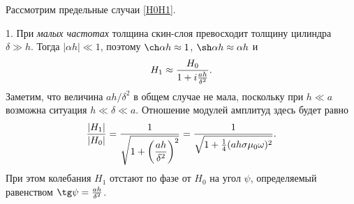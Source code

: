 %
%


Рассмотрим предельные случаи \eqref{H0H1}.

1. При \emph{малых частотах} толщина скин-слоя превосходит толщину цилиндра
$\delta \gg h$. Тогда $|\alpha h| \ll 1$,
поэтому $\ch \alpha h \approx 1$, $\sh \alpha h\approx \alpha h$ и
\begin{equation}\eqmark{H1}
H_1 \approx \frac{H_0}{1 + i \frac{a h}{\delta ^2}}.
\end{equation}
Заметим, что величина $ah/\delta^2$ в общем случае не мала, поскольку
при $h\ll a$ возможна ситуация $h\ll \delta \ll a$.
Отношение модулей амплитуд здесь будет равно
\begin{equation} \eqmark{27}
\frac{|H_1|}{|H_0|} = \frac{1}{\sqrt{1+\left(\dfrac{ah}{\delta^2}\right)^2}} =
\frac{1}{\sqrt{1+\frac14 (ah \sigma \mu_0 \omega)^2}}.
\end{equation}
При этом колебания $H_1$ отстают по фазе от $H_0$ на угол $\psi$,
определяемый равенством $\tg \psi = \frac{ah}{\delta^2}$.


